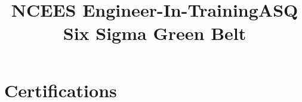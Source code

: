 \documentclass[12pt]{res} %
\begin{document}
\begin{resume}
\begin{multicols}{3}

            \vspace{-10pt}

          \end{multicols}
        \vspace{-24pt}

      \section{Certifications} 

      \vspace{0pt}

            
      \employer{}
      \title{NCEES Engineer-In-Training}
      \dates{}
      \begin{position}
          \vspace{-42pt}
      \end{position}

      \employer{}
      \title{ASQ Six Sigma Green Belt}
      \dates{}
      \begin{position}
          \vspace{-28pt}
      \end{position}

    \end{resume}

\end{document}
